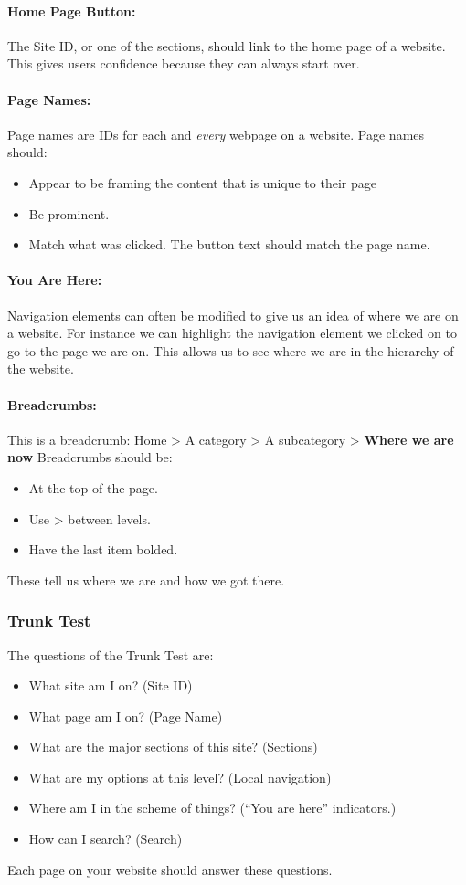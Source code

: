 \documentclass{article}%
\begin{document}
    \paragraph{Home Page Button:}
      The Site ID, or one of the sections, should link to the home page of a website.
      This gives users confidence because they can always start over.
    \paragraph{Page Names:}
      Page names are IDs for each and \emph{every} webpage on a website. \newline
      Page names should:
      \begin{itemize}
        \item Appear to be framing the content that is unique to their page
        \item Be prominent.
        \item Match what was clicked. The button text should match the page name.
      \end{itemize}
    \paragraph{You Are Here:}
      Navigation elements can often be modified to give us an idea of where we are
      on a website. For instance we can highlight the navigation element we clicked
      on to go to the page we are on. This allows us to see where we are in the
      hierarchy of the website.
    \paragraph{Breadcrumbs:}
      This is a breadcrumb: Home > A category > A subcategory > \textbf{Where we are now}
      \newline Breadcrumbs should be:
      \begin{itemize}
        \item At the top of the page.
        \item Use > between levels.
        \item Have the last item bolded.
      \end{itemize}
      These tell us where we are and how we got there.
  \subsubsection{Trunk Test}
    The questions of the Trunk Test are:
    \begin{itemize}
      \item What site am I on? (Site ID)
      \item What page am I on? (Page Name)
      \item What are the major sections of this site? (Sections)
      \item What are my options at this level? (Local navigation)
      \item Where am I in the scheme of things? (``You are here'' indicators.)
      \item How can I search? (Search)
    \end{itemize}
    Each page on your website should answer these questions.
\end{document}

